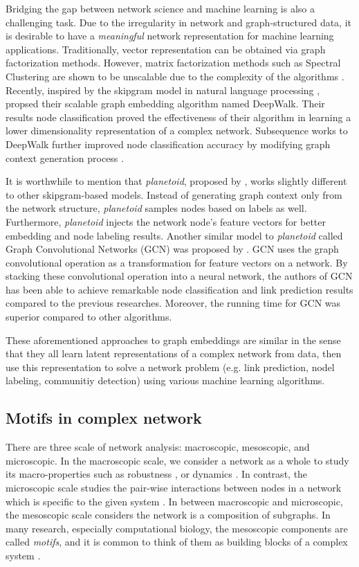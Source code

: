 \documentclass{article}
\theoremstyle{definition}
\begin{document}
Bridging the gap between network science and machine learning
is also a challenging task. Due to the irregularity in network and 
graph-structured data, it is desirable to have a \emph{meaningful}
network representation for machine learning applications. 
Traditionally, vector representation can be obtained via graph factorization methods.
However, matrix factorization methods such as Spectral Clustering are 
shown to be unscalable due to the complexity of the algorithms \cite{deepwalk,line,node2vec}.
Recently, inspired by the skipgram model in natural language processing
\cite{skipgram}, \citeauthor{deepwalk} propsed their scalable graph
embedding algorithm named DeepWalk. Their results node classification
proved the effectiveness of their algorithm in learning a lower dimensionality 
representation of a complex network. Subsequence works to DeepWalk
further improved node classification accuracy by modifying graph 
context generation process \cite{line,grarep,planetoid,node2vec}. 

It is worthwhile to mention that \emph{planetoid}, proposed by \citeauthor{planetoid},
works slightly different to other skipgram-based models. Instead of generating
graph context only from the network structure, \emph{planetoid} samples
nodes based on labels as well. Furthermore, \emph{planetoid} injects the network
node's feature vectors for better embedding and node labeling results.
Another similar model to \emph{planetoid} called Graph Convolutional Networks (GCN) 
was proposed by \citeauthor{gcn}. GCN uses the graph convolutional
operation as a transformation for feature vectors on a network. By stacking
these convolutional operation into a neural network, the authors of
GCN has been able to achieve remarkable node classification and link
prediction results compared to the previous researches. Moreover, the
running time for GCN was superior compared to other algorithms.

These aforementioned approaches to graph embeddings
are similar in the sense that they all learn latent representations
of a complex network from data, then use this representation to solve 
a network problem (e.g. link prediction, nodel labeling, communitiy detection)
using various machine learning algorithms.

\subsection{Motifs in complex network}

There are three scale of network analysis: macroscopic, mesoscopic, 
and microscopic. In the macroscopic scale, we consider a network as a whole to
study its macro-properties such as robustness \cite{callaway2000network},
or dynamics \cite{barabasi2014network}.
In contrast, the microscopic scale studies the pair-wise interactions
between nodes in a network which is specific to the given system \cite{physicnet}. 
In between macroscopic and microscopic, the mesoscopic scale considers the network is a composition of
subgraphs. In many research, especially computational biology, the
mesoscopic components are called \emph{motifs}, and it is common
to think of them as building blocks of a complex system \cite{motifblockmilo}.
\end{document}
